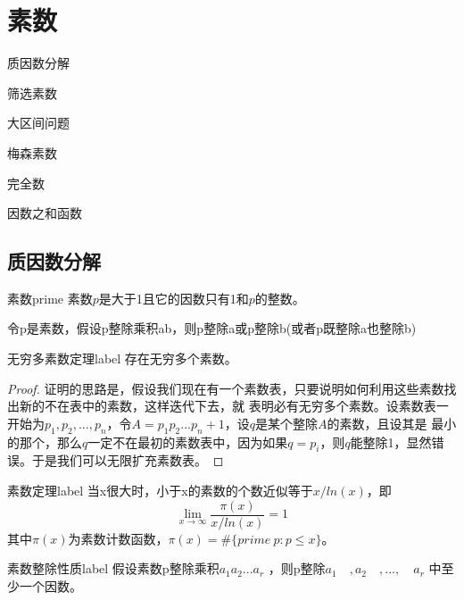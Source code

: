 \chapter{素数}
\begin{introduction}[本章内容提要]
	\item 质因数分解
	\item 筛选素数
	\item 大区间问题
	\item 梅森素数
	\item 完全数
	\item 因数之和函数
\end{introduction}

\section{质因数分解}
\begin{definition}{素数}{prime}
	素数$p$是大于1且它的因数只有1和$p$的整数。
\end{definition}

\begin{property}
	\label{pro:prime}
	令p是素数，假设p整除乘积ab，则p整除a或p整除b(或者p既整除a也整除b)  
\end{property}

\begin{theorem}{无穷多素数定理}{label}
	存在无穷多个素数。
\end{theorem}

\begin{proof}
	证明的思路是，假设我们现在有一个素数表，只要说明如何利用这些素数找出新的不在表中的素数，这样迭代下去，就
表明必有无穷多个素数。设素数表一开始为$p_1,p_2,...,p_n$，令$A = p_1p_2...p_n + 1$，设$q$是某个整除$A$的素数，且设其是
最小的那个，那么$q$一定不在最初的素数表中，因为如果$q=p_i$，则$q$能整除1，显然错误。于是我们可以无限扩充素数表。
\end{proof}

\begin{theorem}{素数定理}{label}
	当x很大时，小于x的素数的个数近似等于$x/ln(x)$，即
	$$
	\lim_{x\to\infty} \frac{\pi(x)}{x/ln(x)}=1
	$$
	其中$\pi(x)$为素数计数函数，$\pi(x) = \#\{prime\ p:p\le x\}$。
\end{theorem}

\begin{theorem}{素数整除性质}{label}
假设素数p整除乘积$a_1a_2...a_r$ ，则p整除$a_1 \quad ,a_2 \quad , ...,\quad a_r$ 中至少一个因数。
\end{theorem}

